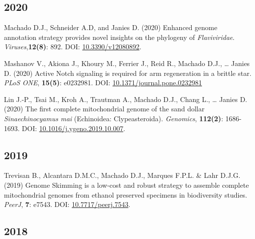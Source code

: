 		
\subsection{2020}

    {\setlength{\parskip}{.5em}\renewcommand{\baselinestretch}{2.0}\begin{hangparas}{.25in}{1}
    
        Machado D.J., Schneider A.D, and Janies D. (2020) Enhanced genome annotation strategy provides novel insights on the phylogeny of \emph{Flaviviridae}. \emph{Viruses},\textbf{12(8)}: 892. DOI: \href{https://www.mdpi.com/1999-4915/12/8/892}{10.3390/v12080892}.

	    Mashanov V., Akiona J., Khoury M., Ferrier J., Reid R., Machado D.J., … Janies D. (2020) Active Notch signaling is required for arm regeneration in a brittle star. \emph{PLoS ONE}, \textbf{15(5)}: e0232981. DOI: \href{https://doi.org/10.1371/journal.pone.0232981}{10.1371/journal.pone.0232981}

	    Lin J.-P., Tsai M., Kroh A., Trautman A., Machado D.J., Chang L., … Janies D. (2020) The first complete mitochondrial genome of the sand dollar \emph{Sinaechinocyamus mai} (Echinoidea: Clypeasteroida). \emph{Genomics}, \textbf{112(2)}: 1686-1693. DOI: \href{https://doi.org/10.1016/j.ygeno.2019.10.007}{10.1016/j.ygeno.2019.10.007}.

	\end{hangparas}}
	

\subsection{2019}

    {\setlength{\parskip}{.5em}\renewcommand{\baselinestretch}{2.0}\begin{hangparas}{.25in}{1}
		Trevisan B., Alcantara D.M.C., Machado D.J., Marques F.P.L. \& Lahr D.J.G. (2019) Genome Skimming is a low-cost and robust strategy to assemble complete mitochondrial genomes from ethanol preserved specimens in biodiversity studies. \emph{PeerJ}, \textbf{7}: e7543. DOI: \href{https://doi.org/10.7717/peerj.7543}{10.7717/peerj.7543}.
	\end{hangparas}}


\subsection{2018}

